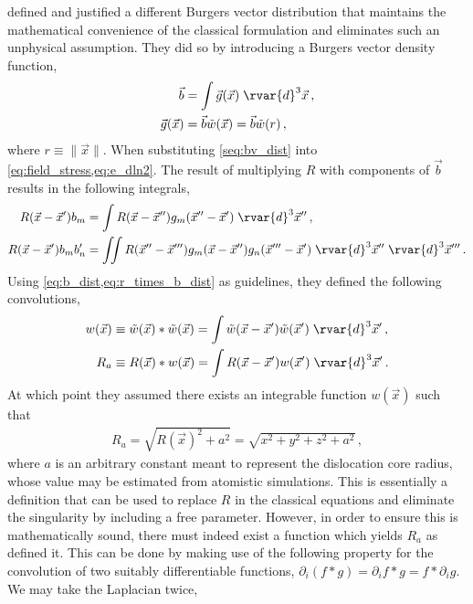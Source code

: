  defined and justified a different Burgers vector distribution that maintains the mathematical convenience of the classical formulation and eliminates such an unphysical assumption. They did so by introducing a Burgers vector density function,
\begin{subequations}\label{eq:b_dist}
    \begin{align}
        \vec{b}          & = \int \vec{g}(\vec{x}) \;\rvar{d}^{3} \vec{x}\label{seq:bv_dist}\,, \\
        \vec{g}(\vec{x}) & = \vec{b} \tilde{w}(\vec{x}) = \vec{b} \tilde{w}(r)\,,
    \end{align}
\end{subequations}
where $ r \equiv \lVert \vec{x} \rVert $. When substituting \cref{seq:bv_dist} into \cref{eq:field_stress,eq:e_dln2}. The result of multiplying $ R $ with components of $ \vec{b} $ results in the following integrals,
\begin{subequations}\label{eq:r_times_b_dist}
    \begin{align}
        R(\vec{x} - \vec{x}') b_{m}        & = \int R(\vec{x} - \vec{x}'') g_{m}(\vec{x}'' - \vec{x}') \;\rvar{d}^{3}\vec{x}''\,,                                                          \\
        R(\vec{x} - \vec{x}') b_{m} b'_{n} & = \iint R(\vec{x}'' - \vec{x}''') g_{m}(\vec{x} - \vec{x}'') g_{n}(\vec{x}''' - \vec{x}') \;\rvar{d}^{3}\vec{x}'' \;\rvar{d}^{3}\vec{x}'''\,.
    \end{align}
\end{subequations}
Using \cref{eq:b_dist,eq:r_times_b_dist} as guidelines, they defined the following convolutions,
\begin{subequations}
    \begin{align}
        w(\vec{x}) & \equiv \tilde{w}(\vec{x}) * \tilde{w}(\vec{x}) = \int \tilde{w}(\vec{x}-\vec{x}')\tilde{w}(\vec{x}')\; \rvar{d}^{3} \vec{x}'\,, \\
        R_{a}      & \equiv R(\vec{x}) * w(\vec{x}) = \int R(\vec{x} - \vec{x}') w(\vec{x}') \;\rvar{d}^{3} \vec{x}'\,.
    \end{align}
\end{subequations}
At which point they assumed there exists an integrable function $ w(\vec{x}) $ such that
\begin{align}
    R_{a} = \sqrt{R(\vec{x})^{2} + a^{2}} = \sqrt{x^{2} + y^{2} + z^{2} + a^{2}}\,,
\end{align}
where $ a $ is an arbitrary constant meant to represent the dislocation core radius, whose value may be estimated from atomistic simulations. This is essentially a definition that can be used to replace $ R $ in the classical equations and eliminate the singularity by including a free parameter. However, in order to ensure this is mathematically sound, there must indeed exist a function which yields $ R_{a} $ as \citet{a_non-singular_continuum_theory_of_dislocations} defined it. This can be done by making use of the following property for the convolution of two suitably differentiable functions, $ \partial_{i} (f*g) = \partial_{i}f * g = f * \partial_{i} g $. We may take the Laplacian twice,
